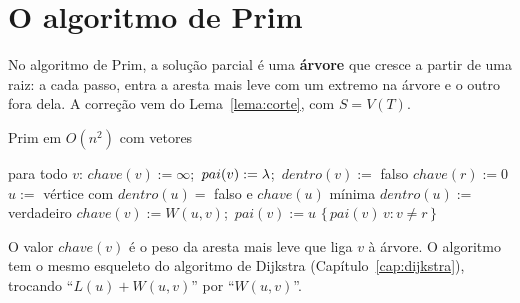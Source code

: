 \section{O algoritmo de Prim}\label{sec:prim}
No algoritmo de Prim, a solução parcial é uma \textbf{árvore} que cresce a partir de uma raiz: a cada passo, entra a aresta mais leve com um extremo na árvore e o outro fora dela. A correção vem do Lema~\ref{lema:corte}, com $S=V(T)$.
\begin{pseudo}{Prim em $O(n^2)$ com vetores}
\begin{algorithmic}
  \State para todo $v$: $chave(v):=\infty$;\ $pai(v):=\lambda$;\ $dentro(v):=$ falso
  \State $chave(r):=0$
    \State $u:=$ vértice com $dentro(u)=$ falso e $chave(u)$ mínima 
    \State $dentro(u):=$ verdadeiro 
     
       \State $chave(v):=W(u,v)$;\ $pai(v):=u$ \EndIf
    \EndFor
  \EndFor
  \State \Return $\{\,pai(v)\,v : v\ne r\,\}$
\EndFunction
\end{algorithmic}
\end{pseudo}
O valor $chave(v)$ é o peso da aresta mais leve que liga $v$ à árvore. O algoritmo tem o mesmo esqueleto do algoritmo de Dijkstra (Capítulo~\ref{cap:dijkstra}), trocando ``$L(u)+W(u,v)$'' por ``$W(u,v)$''.

